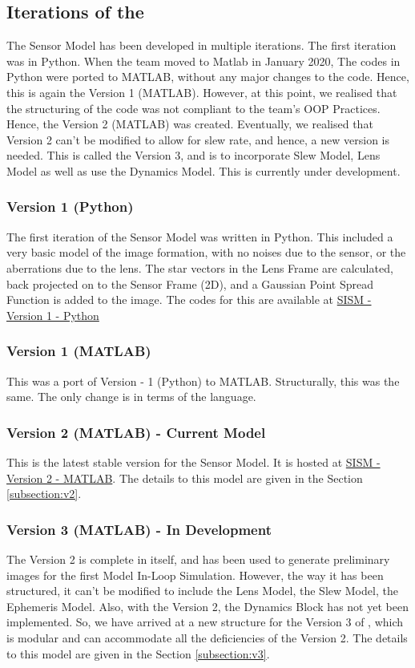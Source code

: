 \documentclass[../../main.tex]{subfiles}
\begin{document}
\subsection{Iterations of the \SISM}
The Sensor Model has been developed in multiple iterations. The first iteration was in Python. When the team moved to Matlab in January 2020, The codes in Python were ported to MATLAB, without any major changes to the code. Hence, this is again the Version 1 (MATLAB). However, at this point, we realised that the structuring of the code was not compliant to the team's OOP Practices. Hence, the Version 2 (MATLAB) was created. Eventually, we realised that Version 2 can't be modified to allow for slew rate, and hence, a new version is needed. This is called the Version 3, and is to incorporate Slew Model, Lens Model as well as use the Dynamics Model. This is currently under development.

\subsubsection{Version 1 (Python)}
The first iteration of the Sensor Model was written in Python. This included a very basic model of the image formation, with no noises due to the sensor, or the aberrations due to the lens. The star vectors in the Lens Frame are calculated, back projected on to the Sensor Frame (2D), and a Gaussian Point Spread Function is added to the image. The codes for this are available at 
\href{https://github.com/Neilabh21/STADS_v1_Python/tree/master/Sensor_Modelling}{SISM - Version 1 - Python}


\subsubsection{Version 1 (MATLAB)}
This was a port of Version - 1 (Python) to MATLAB. Structurally, this was the same. The only change is in terms of the language.

\subsubsection{Version 2 (MATLAB) - Current Model}
This is the latest stable version for the Sensor Model. It is hosted at \href{https://github.com/Neilabh21/STADS_v2_MATLAB/tree/master/Sensor_Model}{SISM - Version 2 - MATLAB}. The details to this model are given in the Section \ref{subsection:v2}.


\subsubsection{Version 3 (MATLAB) - In Development}
The Version 2 is complete in itself, and has been used to generate preliminary images for the first Model In-Loop Simulation. However, the way it has been structured, it can't be modified to include the Lens Model, the Slew Model, the Ephemeris Model. Also, with the Version 2, the Dynamics Block has not yet been implemented. So, we have arrived at a new structure for the Version 3 of \SISM, which is modular and can accommodate all the deficiencies of the Version 2. The details to this model are given in the Section \ref{subsection:v3}.
\end{document}
